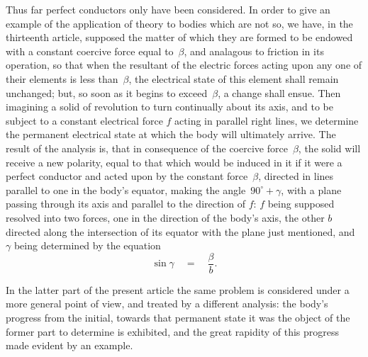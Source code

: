 \documentclass[11pt,notitlepage]{amsart}
\begin{document}
Thus far perfect conductors only have been considered. In order to
give an example of the application of theory to bodies which are not so, we
have, in the thirteenth article, supposed the matter of which they are formed
to be endowed with a constant coercive force equal to~$\beta$, and analagous to
friction in its operation,
so that when the resultant of the electric forces acting
upon any one of their elements is less than~$\beta$,
the electrical state of this
element shall remain unchanged;
but, so soon as it begins to exceed~$\beta$, a
change shall ensue. Then imagining a solid of revolution to turn continually
about its axis, and to be subject to a constant electrical force $f$ acting in
parallel right lines, we determine the permanent electrical state at which the
body will ultimately arrive. The result of the analysis is, that in consequence
of the coercive force~$\beta$,
the solid will receive a new polarity, equal to that
which would be induced in it if it were a perfect conductor and acted upon
by the constant force~$\beta$,
directed in lines parallel to one in the body's equator,
making the angle~$90^\circ+\gamma$,
with a plane passing through its axis and parallel
to the direction of $f$: $f$ being supposed resolved into two forces, one in the
direction of the body's axis, the other $b$
directed along the intersection of its
equator with the plane just mentioned,
and $\gamma$ being determined by the equation
\[
\sin\gamma\quad=\quad\frac{\beta}{b}.
\]

In the latter part of the present article the same problem is considered
under a more general point of view, and treated by a different analysis: the
body's progress from the initial, towards that permanent state it was the object
of the former part to determine is exhibited, and the great rapidity of this
progress made evident by an example.
\end{document}
